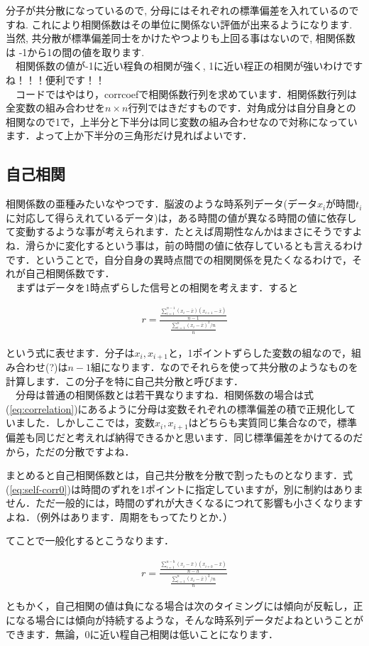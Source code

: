 \documentclass[11pt,a4paper,uplatex]{ujreport}
\begin{document}
分子が共分散になっているので, 分母にはそれぞれの標準偏差を入れているのですね. これにより相関係数はその単位に関係ない評価が出来るようになります. 当然, 共分散が標準偏差同士をかけたやつよりも上回る事はないので, 相関係数は -1から1の間の値を取ります.\\
　相関係数の値が-1に近い程負の相関が強く, 1に近い程正の相関が強いわけですね！！！便利です！！\\
　コードではやはり，corrcoefで相関係数行列を求めています．相関係数行列は全変数の組み合わせを$n \times n$行列ではきだすものです．対角成分は自分自身との相関なので1で，上半分と下半分は同じ変数の組み合わせなので対称になっています．よって上か下半分の三角形だけ見ればよいです．

\subsection{自己相関}
相関係数の亜種みたいなやつです．脳波のような時系列データ(データ$x_i$が時間$t_i$に対応して得らえれているデータ)は，ある時間の値が異なる時間の値に依存して変動するような事が考えられます．たとえば周期性なんかはまさにそうですよね．滑らかに変化するという事は，前の時間の値に依存しているとも言えるわけです．ということで，自分自身の異時点間での相関関係を見たくなるわけで，それが自己相関係数です．\\

　まずはデータを1時点ずらした信号との相関を考えます．すると

\begin{eqnarray}
\label{eq:self-corr0}
r = \frac{\frac{\sum_{i=1}^{n-1} (x_i-\bar x)(x_{i+1} - \bar x)}{n-1}}{\frac{\sum_{i=1}^n (x_i - \bar x)^2 /n}{n}}
\end{eqnarray}

という式に表せます．分子は$x_i, x_{i+1}$と，1ポイントずらした変数の組なので，組み合わせ(?)は$n-1$組になります．なのでそれらを使って共分散のようなものを計算します．この分子を特に自己共分散と呼びます．\\
　分母は普通の相関係数とは若干異なりますね．相関係数の場合は式(\ref{eq:correlation})にあるように分母は変数それぞれの標準偏差の積で正規化していました．しかしここでは，変数$x_i, x_{i+1}$はどちらも実質同じ集合なので，標準偏差も同じだと考えれば納得できるかと思います．同じ標準偏差をかけてるのだから，ただの分散ですよね．

まとめると自己相関係数とは，自己共分散を分散で割ったものとなります．式(\ref{eq:self-corr0})は時間のずれを1ポイントに指定していますが，別に制約はありません．ただ一般的には，時間のずれが大きくなるにつれて影響も小さくなりますよね．（例外はあります．周期をもってたりとか．）

てことで一般化するとこうなります．

\begin{eqnarray}
\label{eq:self-corr}
r = \frac{\frac{\sum_{i=1}^{n-h} (x_i-\bar x)(x_{i+h} - \bar x)}{n-h}}{\frac{\sum_{i=1}^n (x_i - \bar x)^2 /n}{n}}
\end{eqnarray}

ともかく，自己相関の値は負になる場合は次のタイミングには傾向が反転し，正になる場合には傾向が持続するような，そんな時系列データだよねということができます．無論，0に近い程自己相関は低いことになります．\\
\end{document}
